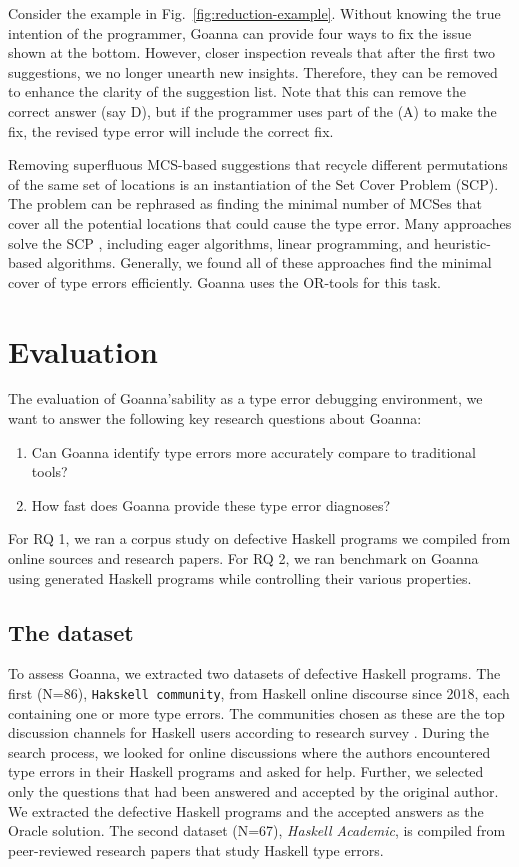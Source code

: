 \documentclass[pdflatex,sn-mathphys-num]{sn-jnl}%
\begin{document}
    Consider the example in Fig.~\ref{fig:reduction-example}. Without knowing the true intention of the programmer, Goanna can provide four ways to fix the issue shown at the bottom. However, closer inspection reveals that after the first two suggestions, we no longer unearth new insights. Therefore, they can be removed to enhance the clarity of the suggestion list. 
    Note that this can remove the correct answer (say D), but if the programmer uses part of the (A) to make the fix, the revised type error will include the correct fix. 
    
    Removing superfluous MCS-based suggestions that recycle different permutations of the same set of locations is an instantiation of the Set Cover Problem (SCP). The problem can be rephrased as finding the minimal number of MCSes that cover all the potential locations that could cause the type error. Many approaches solve the SCP \cite{Caprara2000-vw}, including eager algorithms, linear programming, and heuristic-based algorithms. Generally, we found all of these approaches find the minimal cover of type errors efficiently. Goanna uses the OR-tools \cite{Google_Developers_undated-ew} for this task.
       
    \section{Evaluation} \label{sec:evaluation}
    The evaluation of Goanna'sability as a type error debugging environment, we want to answer the following key research questions about Goanna:

  
    \begin{enumerate}
      \item Can Goanna identify type errors more accurately compare to traditional tools?
      \item How fast does Goanna provide these type error diagnoses?
      \end{enumerate}
 
      For RQ 1, we ran a corpus study on defective Haskell programs we compiled from online sources and research papers. For RQ 2, we ran benchmark on Goanna using generated Haskell programs while controlling their various properties.

    \subsection{The dataset} \label{sub:dataset}   
    To assess Goanna, we extracted two datasets of defective Haskell programs. 
    The first (N=86), \texttt{Hakskell community},  from Haskell online discourse since 2018, each containing one or more type errors. The communities chosen as these are the top discussion channels for Haskell users according to research survey \cite{Fausak2022-zf}. During the search process, we looked for online discussions where the authors encountered type errors in their Haskell programs and asked for help. Further, we selected only the questions that had been answered and accepted by the original author.  We extracted the defective Haskell programs and the accepted answers as the Oracle solution. The second dataset (N=67), \textit{Haskell Academic}, is compiled from peer-reviewed research papers that study Haskell type errors.
\end{document}
